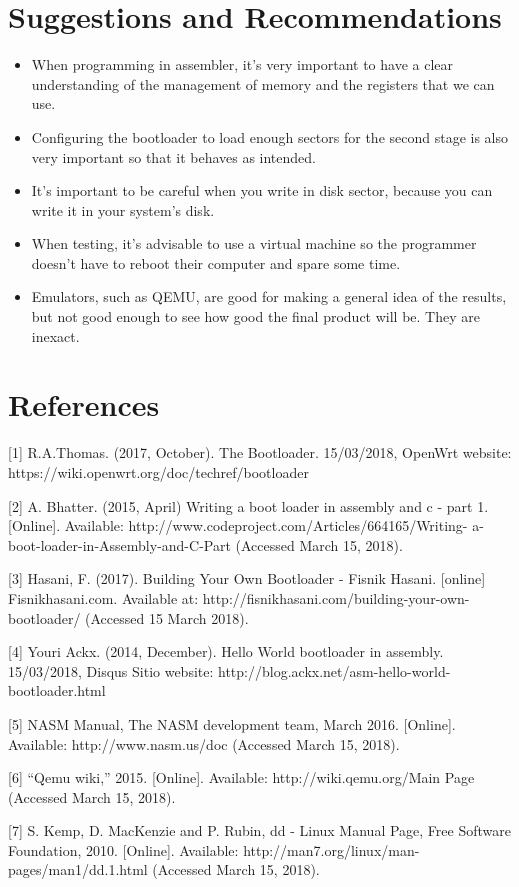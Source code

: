 \documentclass[11pt]{book}
\begin{document}
\section*{Suggestions and Recommendations}
\begin{itemize}
    \item {When programming in assembler, it's very important to have a clear understanding of the management of memory and the registers that we can use.}
    \item {Configuring the bootloader to load enough sectors for the second stage is also very important so that it behaves as intended.}
    \item{It's important to be careful when you write in disk sector, because you can write it in your system’s disk.}
    \item{When testing, it’s advisable to use a virtual machine so the programmer doesn’t have to reboot their computer and spare some time.}
    \item Emulators, such as QEMU, are good for making a general idea of the results, but not good enough to see how good the final product will be. They are inexact.
\end{itemize}


\newpage
\section*{References}


[1] R.A.Thomas. (2017, October). The Bootloader. 15/03/2018, OpenWrt website: https://wiki.openwrt.org/doc/techref/bootloader

[2] A. Bhatter. (2015, April) Writing a boot loader in assembly and c - part 1.
[Online]. Available: http://www.codeproject.com/Articles/664165/Writing-
a-boot-loader-in-Assembly-and-C-Part (Accessed March 15, 2018).

[3] Hasani, F. (2017). Building Your Own Bootloader - Fisnik Hasani. [online] Fisnikhasani.com. Available at: http://fisnikhasani.com/building-your-own-bootloader/ (Accessed 15 March 2018).

[4] Youri Ackx. (2014, December). Hello World bootloader in assembly. 15/03/2018, Disqus Sitio website: http://blog.ackx.net/asm-hello-world-bootloader.html

[5] NASM Manual, The NASM development team, March 2016. [Online].
Available: http://www.nasm.us/doc (Accessed March 15, 2018).

[6] “Qemu wiki,” 2015. [Online]. Available: http://wiki.qemu.org/Main Page
(Accessed March 15, 2018).

[7] S. Kemp, D. MacKenzie and P. Rubin, dd - Linux Manual Page, Free Software Foundation, 2010. [Online]. Available: http://man7.org/linux/man-
pages/man1/dd.1.html (Accessed March 15, 2018).
\end{document}
